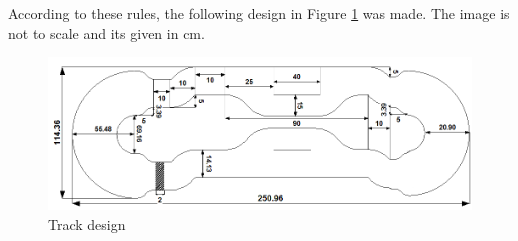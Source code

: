 According to these rules, the following design in Figure \ref{fig:TrackDesign} was made. The image is not to scale and its given in cm.

\begin{figure}[ht]
    \includegraphics[width=1\textwidth]{Images/Design/TrackDesign.PNG}
    \caption{Track design}
    \label{fig:TrackDesign}
\end{figure}








